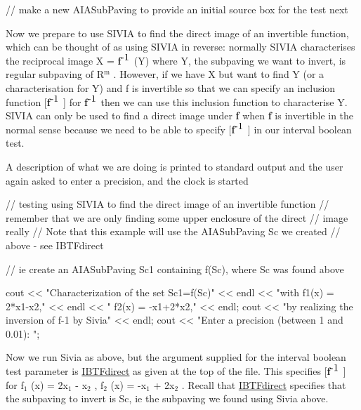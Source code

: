 \begin{DoxyCodeInclude}
  // make a new AIASubPaving to provide an initial source box for the test next

\end{DoxyCodeInclude}


\-Now we prepare to use \-S\-I\-V\-I\-A to find the direct image of an invertible function, which can be thought of as using \-S\-I\-V\-I\-A in reverse\-: normally \-S\-I\-V\-I\-A characterises the reciprocal image \-X = {\bfseries f}$^{\mbox{-\/1}}$ (\-Y) where \-Y, the subpaving we want to invert, is regular subpaving of \-R$^{\mbox{m}}$ . \-However, if we have \-X but want to find \-Y (or a characterisation for \-Y) and f is invertible so that we can specify an inclusion function \mbox{[}{\bfseries f}$^{\mbox{-\/1}}$ \mbox{]} for {\bfseries f}$^{\mbox{-\/1}}$  then we can use this inclusion function to characterise \-Y. \-S\-I\-V\-I\-A can only be used to find a direct image under {\bfseries f} when {\bfseries f} is invertible in the normal sense because we need to be able to specify \mbox{[}{\bfseries f}$^{\mbox{-\/1}}$ \mbox{]} in our interval boolean test.

\-A description of what we are doing is printed to standard output and the user again asked to enter a precision, and the clock is started


\begin{DoxyCodeInclude}
  // testing using SIVIA to find the direct image of an invertible function
  // remember that we are only finding some upper enclosure of the direct 
  // image really
  // Note that this example will use the AIASubPaving Sc we created 
  // above - see IBTFdirect

  // ie create an AIASubPaving Sc1 containing f(Sc), where Sc was found above

  cout << "Characterization of the set Sc1=f(Sc)" << endl
    << "with f1(x) = 2*x1-x2," << endl
    << "      f2(x) = -x1+2*x2," << endl;
  cout << "by realizing the inversion of f-1 by Sivia" << endl;
  cout << "Enter a precision (between 1 and 0.01): ";

\end{DoxyCodeInclude}


\-Now we run \-Sivia as above, but the argument supplied for the interval boolean test parameter is \hyperlink{AIASubPavings_IBTFdirect}{\-I\-B\-T\-Fdirect} as given at the top of the file. \-This specifies \mbox{[}{\bfseries f}$^{\mbox{-\/1}}$ \mbox{]} for f$_{\mbox{1}}$ (x) = 2x$_{\mbox{1}}$  -\/ x$_{\mbox{2}}$ , f$_{\mbox{2}}$ (x) = -\/x$_{\mbox{1}}$  + 2x$_{\mbox{2}}$ . \-Recall that \hyperlink{AIASubPavings_IBTFdirect}{\-I\-B\-T\-Fdirect} specifies that the subpaving to invert is \-Sc, ie the subpaving we found using \-Sivia above.


